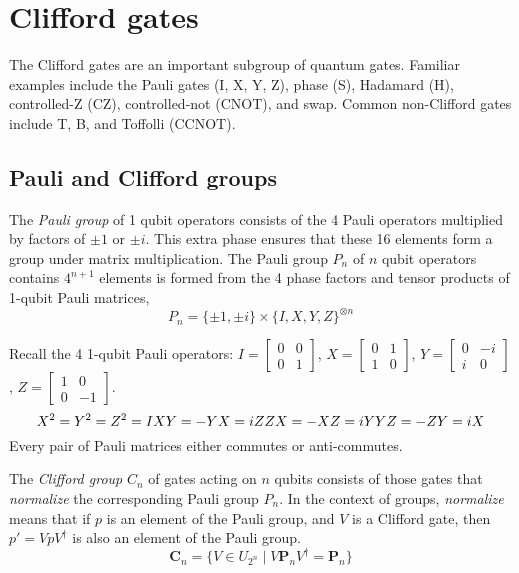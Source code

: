 

\clearpage


\section{Clifford gates}
\label{sec:Clifford}
The Clifford gates are an important subgroup of quantum gates. Familiar examples include the Pauli gates (I, X, Y, Z), phase (S), Hadamard (H), controlled-Z (CZ), controlled-not (CNOT), and swap.  Common non-Clifford gates include T, B, and Toffolli (CCNOT). 

\subsection{Pauli and Clifford groups}
The {\sl Pauli group} of 1 qubit operators  consists of the 4 Pauli operators  multiplied by factors of $\pm 1$ or $\pm i$. This extra phase ensures that these 16 elements form a group under matrix multiplication. The Pauli group $P_n$ of $n$ qubit operators contains $4^{n+1}$ elements is formed from the 4 phase factors and tensor products of 1-qubit Pauli matrices, 
\[
P_n = \{\pm 1, \pm i\} \times \{I, X, Y, Z\}^{\otimes n}
\]

Recall the 4 1-qubit Pauli operators: $I=[\begin{smallmatrix} 0& 0 \\ 0 & 1 \end{smallmatrix}]$,
$X=[\begin{smallmatrix}0 & 1 \\ 1 & 0 \end{smallmatrix}]$, $Y=[\begin{smallmatrix}0 & -i \\ i & 0 \end{smallmatrix}]$, $Z=[\begin{smallmatrix}1 & 0 \\ 0 & -1 \end{smallmatrix}]$.
\[
X^2 = Y^2 = Z^2 = I  \\
XY = -YX = iZ \notag\\
ZX = -XZ = iY \notag\\
YZ = -ZY = iX \notag
\]
Every pair of Pauli matrices either commutes or anti-commutes. 



The {\sl Clifford group}  $C_n$ of gates acting on $n$ qubits consists of those gates that {\sl normalize} the corresponding Pauli group $P_n$. In the context of groups, {\sl normalize} means that if $p$ is an element of the Pauli group, and $V$ is a Clifford gate, then $p' = V p V^\dagger$ is also an element of the Pauli group.
\[
\mathbf{C}_n=\{V\in U_{2^n}\mid V\mathbf{P}_nV^\dagger = \mathbf{P}_n\}
\]


